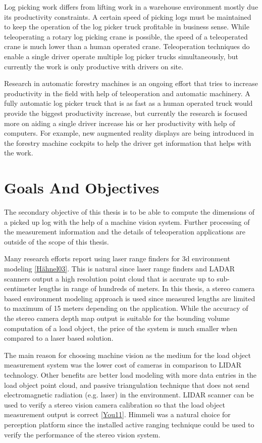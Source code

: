\documentclass[12pt,a4paper,oneside,pdftex]{report}
\begin{document}
Log picking work differs from lifting work in a warehouse environment mostly due its productivity constraints. A certain speed of picking logs must be maintained to keep the operation of the log picker truck profitable in business sense. While teleoperating a rotary log picking crane is possible, the speed of a teleoperated crane is much lower than a human operated crane. Teleoperation techniques do enable a single driver operate multiple log picker trucks simultaneously, but currently the work is only productive with drivers on site. 

Research in automatic forestry machines is an ongoing effort that tries to increase productivity in the field with help of teleoperation and automatic machinery. A fully automatic log picker truck that is as fast as a human operated truck would provide the biggest productivity increase, but currently the research is focused more on aiding a single driver increase his or her productivity with help of computers. For example, new augmented reality displays are being introduced in the forestry machine cockpits to help the driver get information that helps with the work. 

\section{Goals And Objectives}
\label{section:goals_and_objectives}

The secondary objective of this thesis is to be able to compute the dimensions of a picked up log with the help of a machine vision system. Further processing of the measurement information and the details of teleoperation applications are outside of the scope of this thesis.

Many research efforts report using laser range finders for 3d environment modeling \ref{Hähnel03}. This is natural since laser range finders and LADAR scanners output a high resolution point cloud that is accurate up to sub-centimeter lengths in range of hundreds of meters. In this thesis, a stereo camera based environment modeling approach is used since measured lengths are limited to maximum of 15 meters depending on the application. While the accuracy of the stereo camera depth map output is suitable for the bounding volume computation of a load object, the price of the system is much smaller when compared to a laser based solution. 

The main reason for choosing machine vision as the medium for the load object measurement system was the lower cost of cameras in comparison to LIDAR technology. Other benefits are better load modeling with more data entries in the load object point cloud, and passive triangulation technique that does not send electromagnetic radiation (e.g. laser) in the environment. LIDAR scanner can be used to verify a stereo vision camera calibration so that the load object measurement output is correct \ref{You11}. Himmeli was a natural choice for perception platform since the installed active ranging technique could be used to verify the performance of the stereo vision system.
\end{document}
